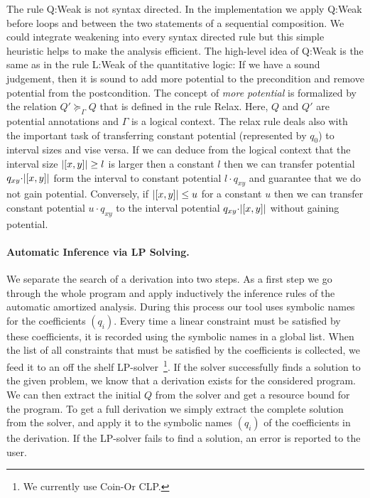\documentclass[nocopyrightspace,preprint]{sigplanconf}
\begin{document}
The rule {\sc Q:Weak} is not syntax directed.  In the implementation
we apply {\sc Q:Weak} before loops and between the two statements of a
sequential composition.  We could integrate weakening into every
syntax directed rule but this simple heuristic helps to make the
analysis efficient.  The high-level idea of {\sc Q:Weak} is the same
as in the rule {\sc L:Weak} of the quantitative logic: If we have a
sound judgement, then it is sound to add more potential to the
precondition and remove potential from the postcondition.  The concept
of \emph{more potential} is formalized by the relation $Q'
\succeq_\Gamma Q$ that is defined in the rule {\sc Relax}.  Here, $Q$
and $Q'$ are potential annotations and $\Gamma$ is a logical context.
The relax rule deals also with the important task of transferring
constant potential (represented by $q_0$) to interval sizes and vise
versa.  If we can deduce from the logical context that the interval
size $|[x,y]| \geq l$ is larger then a constant $l$ then we can
transfer potential $q_{xy} {\cdot} |[x,y]|$ form the interval to
constant potential $l{\cdot}q_{xy}$ and guarantee that we do not gain
potential.  Conversely, if $|[x,y]| \leq u$ for a constant $u$
then we can transfer constant potential $u{\cdot}q_{xy}$ to the
interval potential $q_{xy} {\cdot} |[x,y]|$ without gaining
potential.

\paragraph{Automatic Inference via LP Solving.}

We separate the search of a derivation into two steps.  As a first
step we go through the whole program and apply inductively the
inference rules of the automatic amortized analysis.  During this
process our tool uses symbolic names for the coefficients $(q_i)$.
Every time a linear constraint must be satisfied by these
coefficients, it is recorded using the symbolic names in a global
list.  When the list of all constraints that must be satisfied by the
coefficients is collected, we feed it to an off the shelf
LP-solver~\footnote{We currently use Coin-Or CLP.}.  If the solver
successfully finds a solution to the given problem, we know that a
derivation exists for the considered program.  We can then extract the
initial $Q$ from the solver and get a resource bound for the program.
To get a full derivation we simply extract the complete solution from
the solver, and apply it to the symbolic names $(q_i)$ of the
coefficients in the derivation.  If the LP-solver fails to find a
solution, an error is reported to the user.
\end{document}
